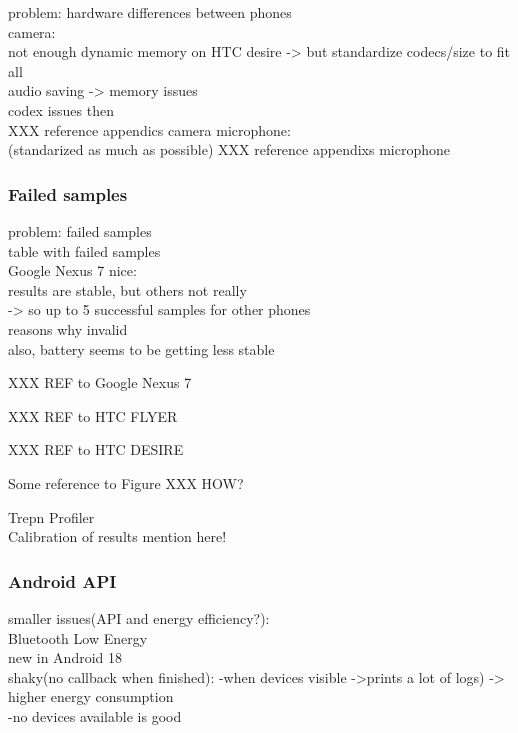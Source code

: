 problem: hardware differences between phones\\
	camera:\\
		not enough dynamic memory on HTC desire -> but standardize codecs/size to fit all\\
		audio saving -> memory issues\\
			codex issues then\\
			XXX reference appendics camera
	microphone:\\
		(standarized as much as possible)
		XXX reference appendixs microphone
			
\subsubsection{Failed samples}
problem: failed samples\\
	table with failed samples\\
	Google Nexus 7 nice:\\
		results are stable, but others not really\\
			-> so up to 5 successful samples for other phones\\
	reasons why invalid\\
	
	also, battery seems to be getting less stable
	
	XXX REF to Google Nexus 7
	

	XXX REF to HTC FLYER

	XXX REF to HTC DESIRE



Some reference to Figure XXX HOW?


	Trepn Profiler\\
	
	
	
	Calibration of results mention here!\\

\subsubsection{Android API}
smaller issues(API and energy efficiency?):\\
	Bluetooth Low Energy\\
		new in Android 18\\
		shaky(no callback when finished):
			-when devices visible ->prints a lot of logs) -> higher energy consumption\\
			-no devices available is good
		
